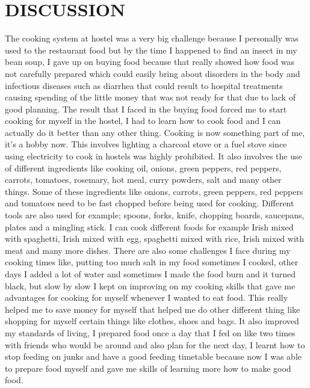 \documentclass[14pt]{article}
\begin{document}
\section{DISCUSSION}
The cooking system at hostel was a very big challenge because I personally was used to the restaurant food but by the time I happened to find an insect in my bean soup, I gave up on buying food because that really showed how food was not carefully prepared which could easily bring about disorders in the body and infectious diseases such as diarrhea that could result to hospital treatments causing spending of the little money that was not ready for that due to lack of good planning.
The result that I faced in the buying food forced me to start cooking for myself in the hostel, I had to learn how to cook food and I can actually do it better than any other thing.  Cooking is now something part of me, it’s a hobby now. This involves lighting a charcoal stove or a fuel stove since using electricity to cook in hostels was highly prohibited. It also involves the use of different ingredients like cooking oil, onions, green peppers, red peppers, carrots, tomatoes, rosemary, hot meal, curry powders, salt and many other things. Some of these ingredients like onions, carrots, green peppers, red peppers and tomatoes need to be fast chopped before being used for cooking.  Different tools are also used for example; spoons, forks, knife, chopping boards, saucepans, plates and a mingling stick. I can cook different foods for example Irish mixed with spaghetti, Irish mixed with egg, spaghetti mixed with rice, Irish mixed with meat and many more dishes. There are also some challenges I face during my cooking times like, putting too much salt in my food sometimes I cooked, other days I added a lot of water and sometimes I made the food burn and it turned black, but slow by slow I kept on improving on my cooking skills that gave me advantages for cooking for myself whenever I wanted to eat food.
This really helped me to save money for myself that helped me do other different thing like shopping for myself certain things like clothes, shoes and bags. It also improved my standards of living, I prepared food once a day that I fed on like two times with friends who would be around and also plan for the next day, I learnt how to stop feeding on junks and have a good feeding timetable because now I was able to prepare food myself and gave me skills of learning more how to make good food.
\end{document}
